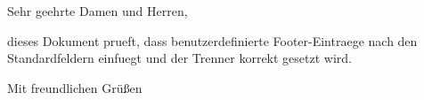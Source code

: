 \documentclass[modern, lang=german]{../../onlinebrief24}
\begin{document}
\begin{letter}{}
\opening{Sehr geehrte Damen und Herren,}

dieses Dokument prueft, dass \texttt{\string\addfooteritem} benutzerdefinierte
Footer-Eintraege nach den Standardfeldern einfuegt und der Trenner korrekt
gesetzt wird.

\closing{Mit freundlichen Gr\"u\ss{}en}
\end{letter}
\end{document}
